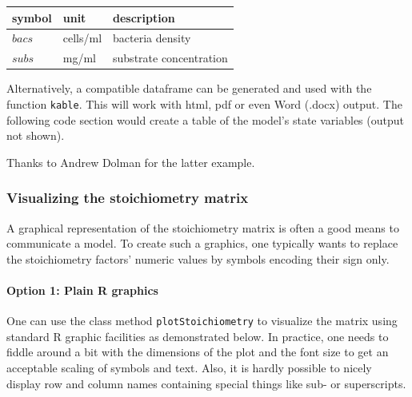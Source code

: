 \documentclass[onecolumn]{article}
\begin{document}
\bigskip
\begin{center}
  \begin{tabular}{lll}\hline
    \textbf{symbol} & \textbf{unit} & \textbf{description} \\ \hline
    $bacs$ & cells/ml & bacteria density \\
    $subs$ & mg/ml & substrate concentration \\ \hline
  \end{tabular}\end{center}

\bigskip
Alternatively, a  compatible dataframe can be generated and used with the  function \verb|kable|. This will work with html, pdf or even Word (.docx) output. The following code section would create a table of the model's state variables (output not shown).

\begin{Schunk}
\end{Schunk}


Thanks to Andrew Dolman for the latter example.

\subsubsection{Visualizing the stoichiometry matrix} \label{sec:advanced:doc:stoi}

A graphical representation of the stoichiometry matrix is often a good means to communicate a model. To create such a graphics, one typically wants to replace the stoichiometry factors' numeric values by symbols encoding their sign only.

\paragraph{Option 1: Plain R graphics}
One can use the class method \verb|plotStoichiometry| to visualize the matrix using standard R graphic facilities as demonstrated below. In practice, one needs to fiddle around a bit with the dimensions of the plot and the font size to get an acceptable scaling of symbols and text. Also, it is hardly possible to nicely display row and column names containing special things like sub- or superscripts.
\end{document}
